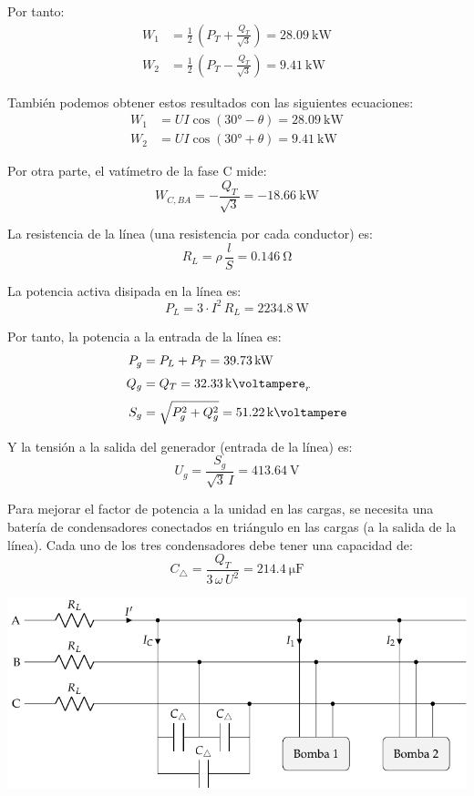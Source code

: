 Por tanto:
\begin{align*}
  W_1 &= \frac{1}{2} \, \left(P_T + \frac{Q_T}{\sqrt{3}} \right) = \SI{28.09}{\kilo\watt}\\[3pt]
  W_2 &= \frac{1}{2} \, \left(P_T - \frac{Q_T}{\sqrt{3}} \right) = \SI{9.41}{\kilo\watt}
\end{align*}

También podemos obtener estos resultados con las siguientes ecuaciones:
\begin{align*}
  W_1 &= U I \cos(\ang{30} - \theta) = \SI{28.09}{\kilo\watt}\\[3pt]
  W_2 &= U I \cos(\ang{30} + \theta) = \SI{9.41}{\kilo\watt}
\end{align*}

Por otra parte, el vatímetro de la fase C mide:
\[
  W_{C, BA} = - \frac{Q_T}{\sqrt{3}} = - \SI{18.66}{\kilo\watt}
\]

La resistencia de la línea (una resistencia por cada conductor) es:
\[
R_L = \rho \, \frac{l}{S} = \SI{0.146}{\ohm}
\]

La potencia activa disipada en la línea es:
\[
P_L = 3 \cdot I^2 \, R_L = \SI{2234.8}{\watt}
\]

Por tanto, la potencia a la entrada de la línea es:
\begin{align*}
    P_g &= P_L + P_T = \SI{39.73}{\kilo\watt}\\[3pt]
    Q_g &= Q_T = \SI{32.33}{\kilo\voltampere}_r\\[3pt]
    S_g &= \sqrt{P_g^2 + Q_g^2} = \SI{51.22}{\kilo\voltampere}
\end{align*}

\vspace{2mm}
Y la tensión a la salida del generador (entrada de la línea) es:
\[
U_g = \frac{S_g}{\sqrt{3} \, I} = \SI{413.64}{\volt}
\]

Para mejorar el factor de potencia a la unidad en las cargas, se necesita una batería de condensadores conectados en triángulo en las cargas (a la salida de la línea). Cada uno de los tres condensadores debe tener una capacidad de:
\[
C_{\triangle} = \frac{Q_T}{3 \, \omega \, U^2} = \SI{214.4}{\micro\farad}
\]

\begin{center}
    \includegraphics[width=.85\textwidth]{figuras/BT3_ej5_bombas_condensadores.pdf}
\end{center}

